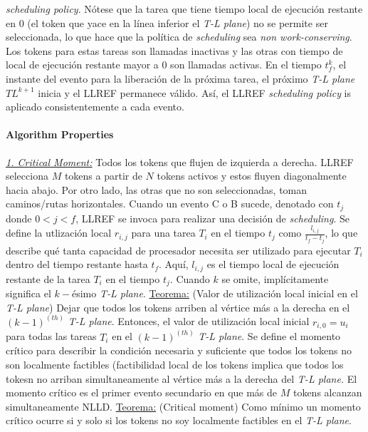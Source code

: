\emph{scheduling policy}. Nótese que la tarea que tiene tiempo local de ejecución restante en 0 (el token que yace en la línea inferior el \emph{T-L plane}) no se permite ser seleccionada, lo que hace que la política de \emph{scheduling} sea \emph{non work-conserving}. Los tokens para estas tareas son llamadas inactivas y las otras con tiempo de local de ejecución restante mayor a 0 son llamadas activas. En el tiempo $t_{f}^{k}$, el instante del evento para la liberación de la próxima tarea, el próximo \emph{T-L plane} $TL^{k + 1}$ inicia y el LLREF permanece válido. Así, el LLREF \emph{scheduling policy} is aplicado consistentemente a cada evento.

\paragraph{\textnormal{\textbf{Algorithm Properties}}} \underline{\emph{1. Critical Moment:}} Todos los tokens que flujen de izquierda a derecha. LLREF selecciona $M$ tokens a partir de $N$ tokens activos y estos fluyen diagonalmente hacia abajo. Por otro lado, las otras que no son seleccionadas, toman caminos/rutas horizontales. Cuando un evento C o B sucede, denotado con $t_j$ donde $0 < j < f$, LLREF se invoca para realizar una decisión de \emph{scheduling}. Se define la utlización local $r_{i,j}$ para una tarea $T_i$ en el tiempo $t_j$ como $\frac{l_{i,j}}{t_f - t_j}$, lo que describe qué tanta capacidad de procesador necesita ser utilizado para ejecutar $T_i$ dentro del tiempo restante hasta $t_f$. Aquí, $l_{i,j}$ es el tiempo local de ejecución restante de la tarea $T_i$ en el tiempo $t_j$. Cuando $k$ se omite, implícitamente significa el $k-$ésimo \emph{T-L plane}. \underline{Teorema:} (Valor de utilización local inicial en el \emph{T-L plane}) Dejar que todos los tokens arriben al vértice más a la derecha en el $(k - 1)^{(th)}$ \emph{T-L plane}. Entonces, el valor de utilización local inicial $r_{i,0} = u_i$ para todas las tareas $T_i$ en el $(k - 1)^{(th)}$ \emph{T-L plane}. Se define el momento crítico para describir la condición necesaria y suficiente que todos los tokens no son localmente factibles (factibilidad local de los tokens implica que todos los tokesn no arriban simultaneamente al vértice más a la derecha del \emph{T-L plane.} El momento crítico es el primer evento secundario en que más de $M$ tokens alcanzan simultaneamente NLLD. \underline{Teorema:} (Critical moment)  Como mínimo un momento crítico ocurre si y solo si los tokens no soy localmente factibles en el \emph{T-L plane}. 

